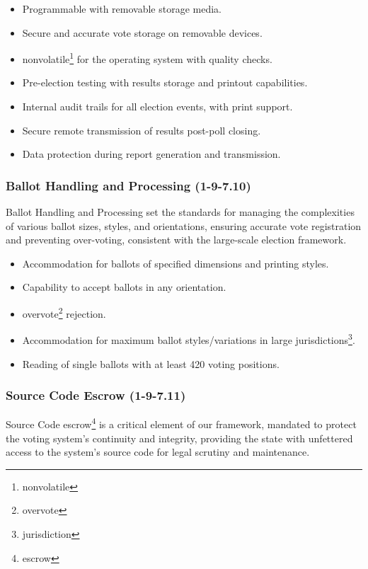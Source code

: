 \documentclass{article}
\begin{document}
\begin{itemize}
    \item Programmable with removable storage media. 
    \item Secure and accurate vote storage on removable devices.
    \item \Gls{nonvolatile}\footnote{\glsdesc{nonvolatile}} for the operating system with quality checks.
    \item Pre-election testing with results storage and printout capabilities.
    \item Internal audit trails for all election events, with print support.
    \item Secure remote transmission of results post-poll closing.
    \item Data protection during report generation and transmission.
\end{itemize}

\subsubsection{Ballot Handling and Processing (1-9-7.10)}
Ballot Handling and Processing set the standards for managing the complexities of various ballot sizes, styles, and orientations, ensuring accurate vote registration and preventing over-voting, consistent with the large-scale election framework.

\begin{itemize}
    \item Accommodation for ballots of specified dimensions and printing styles.
    \item Capability to accept ballots in any orientation.
    \item \Gls{overvote}\footnote{\glsdesc{overvote}} rejection.
    \item Accommodation for maximum ballot styles/variations in large \glspl{jurisdiction}\footnote{\glsdesc{jurisdiction}}.
    \item Reading of single ballots with at least 420 voting positions.
\end{itemize}

\subsubsection{Source Code Escrow (1-9-7.11)}
Source Code \Gls{escrow}\footnote{\glsdesc{escrow}} is a critical element of our framework, mandated to protect the voting system's continuity and integrity, providing the state with unfettered access to the system's source code for legal scrutiny and maintenance.
\end{document}
